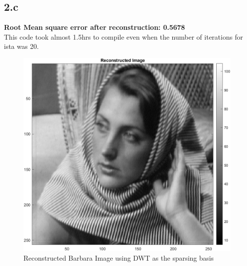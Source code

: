 \documentclass[12pt]{article}
\begin{document}
\subsection*{2.c}
\textbf{Root Mean square error after reconstruction: 0.5678}\\
This code took almost 1.5hrs to compile even when the number of iterations for ista was 20.
\begin{figure}[H]
  \centering
  \includegraphics[scale=0.4]{rec_dwt.png}  %
  \caption{Reconstructed Barbara Image using DWT as the sparsing basis}
  \label{fig:4}
\end{figure}
\clearpage
\end{document}
